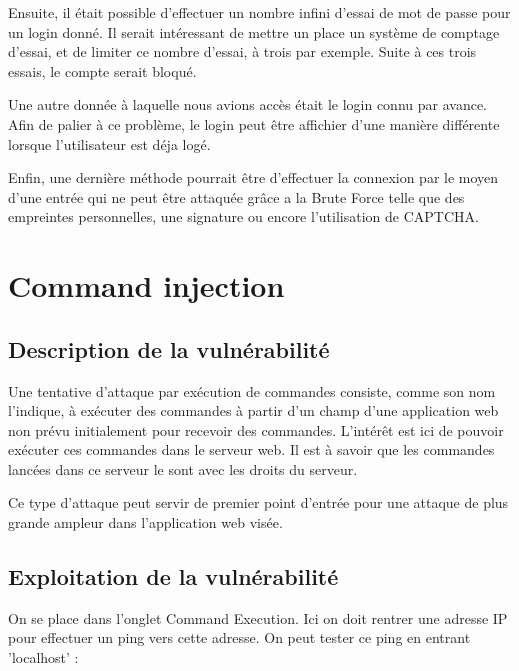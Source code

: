 Ensuite, il était possible d'effectuer un nombre infini d'essai de mot de passe pour un login donné. Il serait intéressant de mettre un place un système de comptage d'essai, et de limiter ce nombre d'essai, à trois par exemple. Suite à ces trois essais, le compte serait bloqué.

Une autre donnée à laquelle nous avions accès était le login connu par avance. Afin de palier à ce problème, le login peut être affichier d'une manière différente lorsque l'utilisateur est déja logé.

Enfin, une dernière méthode pourrait être d'effectuer la connexion par le moyen d'une entrée qui ne peut être attaquée grâce a la Brute Force telle que des empreintes personnelles, une signature ou encore l'utilisation de CAPTCHA.

\clearpage

\newpage

\section{Command injection}

\subsection{Description de la vulnérabilité}

Une tentative d'attaque par exécution de commandes consiste, comme son nom l'indique, à exécuter des commandes à partir d'un champ d'une application web non prévu initialement pour recevoir des commandes. L'intérêt est ici de pouvoir exécuter ces commandes dans le serveur web. Il est à savoir que les commandes lancées dans ce serveur le sont avec les droits du serveur.

Ce type d'attaque peut servir de premier point d'entrée pour une attaque de plus grande ampleur dans l'application web visée.


\subsection{Exploitation de la vulnérabilité}

On se place dans l'onglet Command Execution. Ici on doit rentrer une adresse IP pour effectuer un ping vers cette adresse. On peut tester ce ping en entrant 'localhost' :

